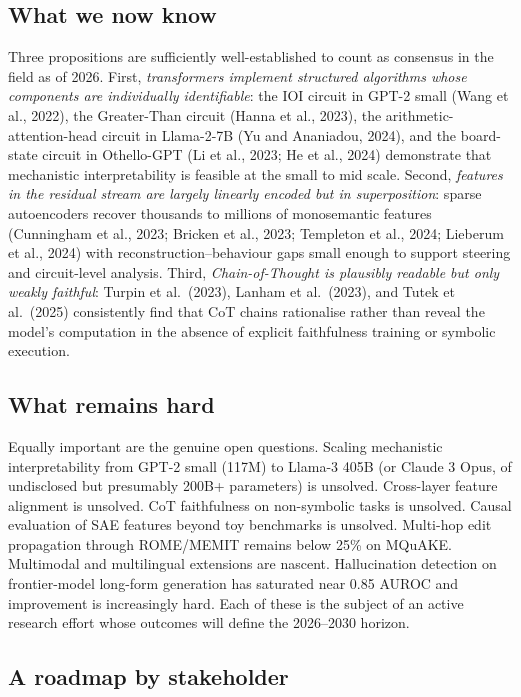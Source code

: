 \subsection{What we now know}\label{what-we-now-know}

Three propositions are sufficiently well-established to count as consensus in the field as of 2026. First, \emph{transformers implement structured algorithms whose components are individually identifiable}: the IOI circuit in GPT-2 small (Wang et al., 2022), the Greater-Than circuit (Hanna et al., 2023), the arithmetic-attention-head circuit in Llama-2-7B (Yu and Ananiadou, 2024), and the board-state circuit in Othello-GPT (Li et al., 2023; He et al., 2024) demonstrate that mechanistic interpretability is feasible at the small to mid scale. Second, \emph{features in the residual stream are largely linearly encoded but in superposition}: sparse autoencoders recover thousands to millions of monosemantic features (Cunningham et al., 2023; Bricken et al., 2023; Templeton et al., 2024; Lieberum et al., 2024) with reconstruction--behaviour gaps small enough to support steering and circuit-level analysis. Third, \emph{Chain-of-Thought is plausibly readable but only weakly faithful}: Turpin et al.~(2023), Lanham et al.~(2023), and Tutek et al.~(2025) consistently find that CoT chains rationalise rather than reveal the model's computation in the absence of explicit faithfulness training or symbolic execution.

\subsection{What remains hard}\label{what-remains-hard}

Equally important are the genuine open questions. Scaling mechanistic interpretability from GPT-2 small (117M) to Llama-3 405B (or Claude 3 Opus, of undisclosed but presumably 200B+ parameters) is unsolved. Cross-layer feature alignment is unsolved. CoT faithfulness on non-symbolic tasks is unsolved. Causal evaluation of SAE features beyond toy benchmarks is unsolved. Multi-hop edit propagation through ROME/MEMIT remains below 25\% on MQuAKE. Multimodal and multilingual extensions are nascent. Hallucination detection on frontier-model long-form generation has saturated near 0.85 AUROC and improvement is increasingly hard. Each of these is the subject of an active research effort whose outcomes will define the 2026--2030 horizon.

\subsection{A roadmap by stakeholder}\label{a-roadmap-by-stakeholder}

